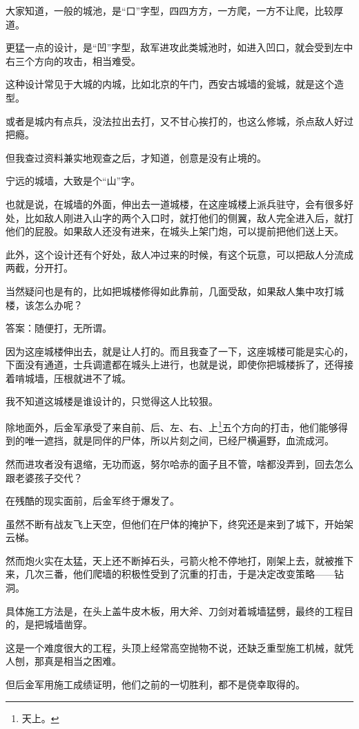 \begin{multicols}{\theparacolNo}
		大家知道，一般的城池，是“口”字型，四四方方，一方爬，一方不让爬，比较厚道。

		更猛一点的设计，是“凹”字型，敌军进攻此类城池时，如进入凹口，就会受到左中右三个方向的攻击，相当难受。

		这种设计常见于大城的内城，比如北京的午门，西安古城墙的瓮城，就是这个造型。

		或者是城内有点兵，没法拉出去打，又不甘心挨打的，也这么修城，杀点敌人好过把瘾。

		但我查过资料兼实地观查之后，才知道，创意是没有止境的。

		宁远的城墙，大致是个“山”字。

		也就是说，在城墙的外面，伸出去一道城楼，在这座城楼上派兵驻守，会有很多好处，比如敌人刚进入山字的两个入口时，就打他们的侧翼，敌人完全进入后，就打他们的屁股。如果敌人还没有进来，在城头上架门炮，可以提前把他们送上天。

		此外，这个设计还有个好处，敌人冲过来的时候，有这个玩意，可以把敌人分流成两截，分开打。

		当然疑问也是有的，比如把城楼修得如此靠前，几面受敌，如果敌人集中攻打城楼，该怎么办呢？

		答案：随便打，无所谓。

		因为这座城楼伸出去，就是让人打的。而且我查了一下，这座城楼可能是实心的，下面没有通道，士兵调遣都在城头上进行，也就是说，即使你把城楼拆了，还得接着啃城墙，压根就进不了城。

		我不知道这城楼是谁设计的，只觉得这人比较狠。

		除地面外，后金军承受了来自前、后、左、右、上\footnote{天上。}五个方向的打击，他们能够得到的唯一遮挡，就是同伴的尸体，所以片刻之间，已经尸横遍野，血流成河。

		然而进攻者没有退缩，无功而返，努尔哈赤的面子且不管，啥都没弄到，回去怎么跟老婆孩子交代？

		在残酷的现实面前，后金军终于爆发了。

		虽然不断有战友飞上天空，但他们在尸体的掩护下，终究还是来到了城下，开始架云梯。

		然而炮火实在太猛，天上还不断掉石头，弓箭火枪不停地打，刚架上去，就被推下来，几次三番，他们爬墙的积极性受到了沉重的打击，于是决定改变策略——钻洞。

		具体施工方法是，在头上盖牛皮木板，用大斧、刀剑对着城墙猛劈，最终的工程目的，是把城墙凿穿。

		这是一个难度很大的工程，头顶上经常高空抛物不说，还缺乏重型施工机械，就凭人刨，那真是相当之困难。

		但后金军用施工成绩证明，他们之前的一切胜利，都不是侥幸取得的。


\end{multicols}
